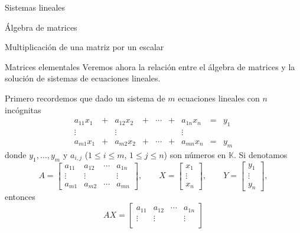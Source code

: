 \documentclass[a4paper,12pt,twoside,spanish,reqno]{amsbook}
\theoremstyle{definition}
\theoremstyle{remark}
\newcommand{\K}{\mathbb K}
\begin{document}
\begin{chapter}{Sistemas lineales}
\begin{section}{Álgebra de matrices}
\begin{subsection}{Multiplicación de una matriz por un escalar}
        \end{subsection}
            
            
        \end{section}
        
        \begin{section}{Matrices elementales}
            Veremos ahora la relación entre el álgebra de matrices y la solución de sistemas de ecuaciones lineales. 
            
            Primero recordemos que dado un sistema de $m$  ecuaciones lineales con $n$ incógnitas
            \begin{equation}\label{sist-eq-gen-3}
            \begin{matrix} 
            a_{11}x_1& + &a_{12}x_2& + &\cdots& + &a_{1n}x_n &= &y_1\\
            \vdots&  &\vdots& &&  &\vdots \\
            a_{m1}x_1& + &a_{m2}x_2& + &\cdots& + &a_{mn}x_n &=&y_m
            \end{matrix}
            \end{equation}
            donde $y_1, \ldots,y_m$ y $a_{i,j}$ ($1 \le i \le m$, $1 \le j \le n$) son números en $\K$. Si denotamos
            \begin{equation*}
            A = \begin{bmatrix}
            a_{11}& a_{12}& \cdots &a_{1n} \\
            \vdots&\vdots  &  &\vdots \\
            a_{m1} &a_{m2}&\cdots &a_{mn}\end{bmatrix},\qquad
            X = \begin{bmatrix}
            x_1 \\ \vdots \\ x_n 
            \end{bmatrix},
            \qquad 
            Y = \begin{bmatrix}
            y_1 \\ \vdots \\ y_n
            \end{bmatrix},
            \end{equation*}
            entonces 
            \begin{equation*}
            AX = \begin{bmatrix}
            a_{11}& a_{12}& \cdots &a_{1n} \\
            \vdots&\vdots  &  &\vdots \\

\end{bmatrix}
\end{equation*}
\end{section}
\end{chapter}
\end{document}
